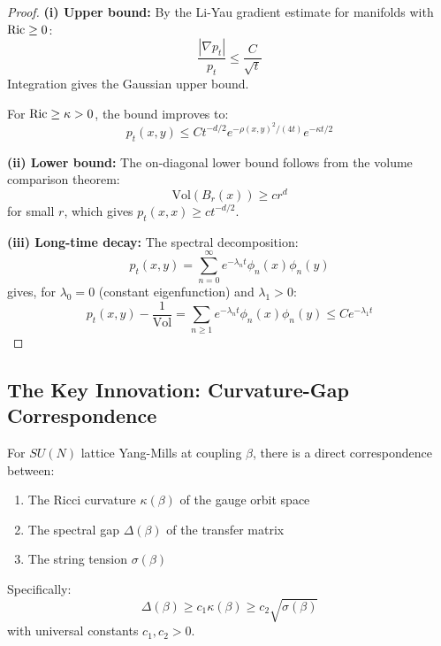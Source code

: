 \begin{proof}
\textbf{(i) Upper bound:}
By the Li-Yau gradient estimate for manifolds with $\operatorname{Ric} \geq 0$:
\[
\frac{|\nabla p_t|}{p_t} \leq \frac{C}{\sqrt{t}}
\]
Integration gives the Gaussian upper bound.

For $\operatorname{Ric} \geq \kappa > 0$, the bound improves to:
\[
p_t(x, y) \leq C t^{-d/2} e^{-\rho(x,y)^2/(4t)} e^{-\kappa t/2}
\]

\textbf{(ii) Lower bound:}
The on-diagonal lower bound follows from the volume comparison theorem:
\[
\text{Vol}(B_r(x)) \geq c r^d
\]
for small $r$, which gives $p_t(x,x) \geq c t^{-d/2}$.

\textbf{(iii) Long-time decay:}
The spectral decomposition:
\[
p_t(x, y) = \sum_{n=0}^\infty e^{-\lambda_n t} \phi_n(x) \phi_n(y)
\]
gives, for $\lambda_0 = 0$ (constant eigenfunction) and $\lambda_1 > 0$:
\[
p_t(x, y) - \frac{1}{\text{Vol}} = \sum_{n \geq 1} e^{-\lambda_n t} \phi_n(x)\phi_n(y) 
\leq C e^{-\lambda_1 t}
\]
\end{proof}

\subsection{The Key Innovation: Curvature-Gap Correspondence}

\begin{theorem}
\label{thm:curvature-gap}
For $SU(N)$ lattice Yang-Mills at coupling $\beta$, there is a direct 
correspondence between:
\begin{enumerate}[label=(\roman*)]
\item The Ricci curvature $\kappa(\beta)$ of the gauge orbit space
\item The spectral gap $\Delta(\beta)$ of the transfer matrix
\item The string tension $\sigma(\beta)$
\end{enumerate}
Specifically:
\[
\Delta(\beta) \geq c_1 \kappa(\beta) \geq c_2 \sqrt{\sigma(\beta)}
\]
with universal constants $c_1, c_2 > 0$.
\end{theorem}

